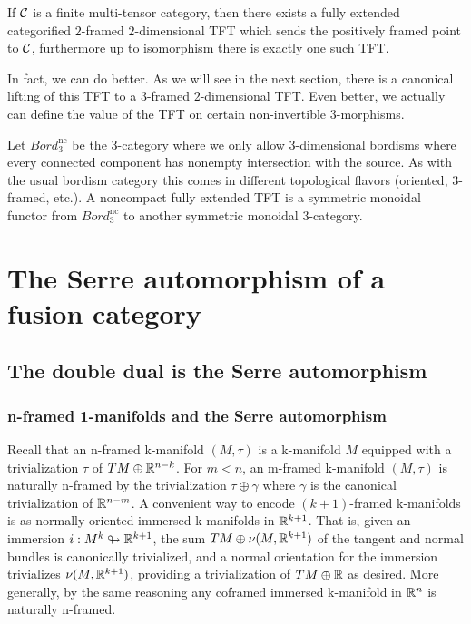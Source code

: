 \documentclass{amsart}
\begin{document}
\begin{corollary}
If $\mathcal C$ is a finite multi-tensor category, then there exists a fully extended categorified $2$-framed $2$-dimensional TFT which sends the positively framed point to $\mathcal C$, furthermore up to isomorphism there is exactly one such TFT.
\end{corollary}

In fact, we can do better.  As we will see in the next section, there is a canonical lifting of this TFT to a $3$-framed $2$-dimensional TFT.  Even better, we actually can define the value of the TFT on certain non-invertible $3$-morphisms.

\begin{definition}
Let $Bord_3^{\text{nc}}$ be the $3$-category where we only allow $3$-dimensional bordisms where every connected component has nonempty intersection with the source.  As with the usual bordism category this comes in different topological flavors (oriented, $3$-framed, etc.).  A noncompact fully extended TFT is a symmetric monoidal functor from $Bord_3^{\text{nc}}$ to another symmetric monoidal $3$-category.
\end{definition}



\section{The Serre automorphism of a fusion category} \label{sec-serre}




\subsection{The double dual is the Serre automorphism} \label{sec-serre-dd}



\subsubsection{n-framed 1-manifolds and the Serre automorphism} \label{sec-serre-oneman}

Recall that an n-framed k-manifold $(M,\tau)$ is a k-manifold $M$ equipped with a trivialization $\tau$ of $TM \oplus \mathbb R^{n-k}$.  For $m < n$, an m-framed k-manifold $(M,\tau)$ is naturally n-framed by the trivialization $\tau \oplus \gamma$ where $\gamma$ is the canonical trivialization of $\mathbb R^{n-m}$.  A convenient way to encode $(k+1)$-framed k-manifolds is as normally-oriented immersed k-manifolds in $\mathbb R^{k+1}$.  That is, given an immersion $i: M^k \looparrowright \mathbb R^{k+1}$, the sum $TM \oplus \nu(M,\mathbb R^{k+1})$ of the tangent and normal bundles is canonically trivialized, and a normal orientation for the immersion trivializes $\nu(M,\mathbb R^{k+1})$, providing a trivialization of $TM \oplus \mathbb R$ as desired.  More generally, by the same reasoning any coframed immersed k-manifold in $\mathbb R^n$ is naturally n-framed.
\end{document}
